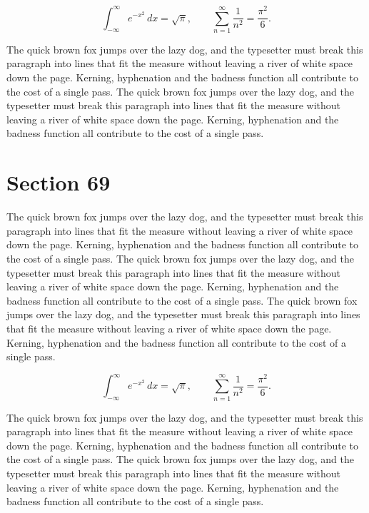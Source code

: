 \documentclass{article}
\begin{document}
\begin{equation}
\int_{-\infty}^{\infty} e^{-x^{2}}\,dx = \sqrt{\pi}, \qquad
\sum_{n=1}^{\infty} \frac{1}{n^{2}} = \frac{\pi^{2}}{6}.
\end{equation}

The quick brown fox jumps over the lazy dog, and the typesetter must break this paragraph into lines that fit the measure without leaving a river of white space down the page. Kerning, hyphenation and the badness function all contribute to the cost of a single pass. The quick brown fox jumps over the lazy dog, and the typesetter must break this paragraph into lines that fit the measure without leaving a river of white space down the page. Kerning, hyphenation and the badness function all contribute to the cost of a single pass. 
\section{Section 69}
The quick brown fox jumps over the lazy dog, and the typesetter must break this paragraph into lines that fit the measure without leaving a river of white space down the page. Kerning, hyphenation and the badness function all contribute to the cost of a single pass. The quick brown fox jumps over the lazy dog, and the typesetter must break this paragraph into lines that fit the measure without leaving a river of white space down the page. Kerning, hyphenation and the badness function all contribute to the cost of a single pass. The quick brown fox jumps over the lazy dog, and the typesetter must break this paragraph into lines that fit the measure without leaving a river of white space down the page. Kerning, hyphenation and the badness function all contribute to the cost of a single pass. 

\begin{equation}
\int_{-\infty}^{\infty} e^{-x^{2}}\,dx = \sqrt{\pi}, \qquad
\sum_{n=1}^{\infty} \frac{1}{n^{2}} = \frac{\pi^{2}}{6}.
\end{equation}

The quick brown fox jumps over the lazy dog, and the typesetter must break this paragraph into lines that fit the measure without leaving a river of white space down the page. Kerning, hyphenation and the badness function all contribute to the cost of a single pass. The quick brown fox jumps over the lazy dog, and the typesetter must break this paragraph into lines that fit the measure without leaving a river of white space down the page. Kerning, hyphenation and the badness function all contribute to the cost of a single pass. 
\end{document}
